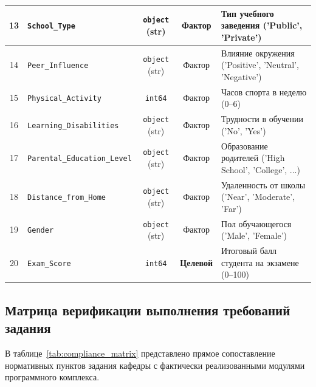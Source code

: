 \documentclass[14pt,a4paper]{extarticle}
\begin{document}
\begin{table}[H]
\begin{tabularx}{\textwidth}{|c|>{\raggedright\arraybackslash}p{3.8cm}|c|c|>{\raggedright\arraybackslash}X|}
        \hline
        13 & \texttt{School\_Type} & \texttt{object} (str) & Фактор & Тип учебного заведения ('Public', 'Private') \\
        \hline
        14 & \texttt{Peer\_Influence} & \texttt{object} (str) & Фактор & Влияние окружения ('Positive', 'Neutral', 'Negative') \\
        \hline
        15 & \texttt{Physical\_Activity} & \texttt{int64} & Фактор & Часов спорта в неделю (0--6) \\
        \hline
        16 & \texttt{Learning\_Disabilities} & \texttt{object} (str) & Фактор & Трудности в обучении ('No', 'Yes') \\
        \hline
        17 & \texttt{Parental\_Education\_Level} & \texttt{object} (str) & Фактор & Образование родителей ('High School', 'College', ...) \\
        \hline
        18 & \texttt{Distance\_from\_Home} & \texttt{object} (str) & Фактор & Удаленность от школы ('Near', 'Moderate', 'Far') \\
        \hline
        19 & \texttt{Gender} & \texttt{object} (str) & Фактор & Пол обучающегося ('Male', 'Female') \\
        \hline
        20 & \texttt{Exam\_Score} & \texttt{int64} & \textbf{Целевой} & Итоговый балл студента на экзамене (0--100) \\
        \hline
    \end{tabularx}
\end{table}

\subsection{Матрица верификации выполнения требований задания}

В таблице~\ref{tab:compliance_matrix} представлено прямое сопоставление нормативных пунктов задания кафедры с фактически реализованными модулями программного комплекса.
\end{document}
